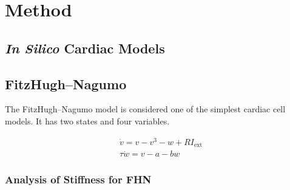 \chapter{Method}
\label{sec:method}


\section{\textit{In Silico} Cardiac Models}




\section{FitzHugh–Nagumo}

The FitzHugh–Nagumo model is considered one of the simplest cardiac cell models. It has two states and four variables.

\begin{align}\label{eq:fhn} %
	&\dot{v}=v-v^{3}-w+R I_{\mathrm{ext}} \\
	&\tau \dot{w}=v-a-b w
\end{align}



\subsection{Analysis of Stiffness for FHN}

